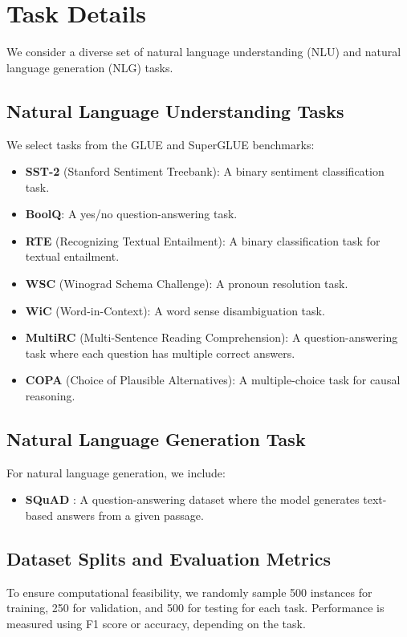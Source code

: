 \section{Task Details}
\label{appendix:task_details}

We consider a diverse set of natural language understanding (NLU) and natural language generation (NLG) tasks. 

\subsection{Natural Language Understanding Tasks}
We select tasks from the GLUE \citep{wang-etal-2018-glue} and SuperGLUE \citep{wang2019superglue} benchmarks:
\begin{itemize}
    \item \textbf{SST-2} (Stanford Sentiment Treebank): A binary sentiment classification task.
    \item \textbf{BoolQ}: A yes/no question-answering task.
    \item \textbf{RTE} (Recognizing Textual Entailment): A binary classification task for textual entailment.
    \item \textbf{WSC} (Winograd Schema Challenge): A pronoun resolution task.
    \item \textbf{WiC} (Word-in-Context): A word sense disambiguation task.
    \item \textbf{MultiRC} (Multi-Sentence Reading Comprehension): A question-answering task where each question has multiple correct answers.
    \item \textbf{COPA} (Choice of Plausible Alternatives): A multiple-choice task for causal reasoning.
\end{itemize}

\subsection{Natural Language Generation Task}
For natural language generation, we include:
\begin{itemize}
    \item \textbf{SQuAD} \citep{rajpurkar2016squad}: A question-answering dataset where the model generates text-based answers from a given passage.
\end{itemize}

\subsection{Dataset Splits and Evaluation Metrics}
To ensure computational feasibility, we randomly sample 500 instances for training, 250 for validation, and 500 for testing for each task. Performance is measured using F1 score or accuracy, depending on the task.


